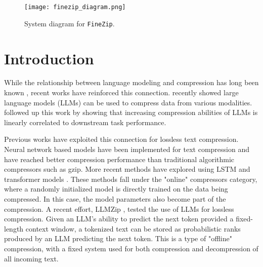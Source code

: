 \documentclass[11pt]{article}
\begin{document}

\begin{figure*}[ht]
    \centering
    \texttt{[image: finezip\_diagram.png]} %
    \centering
    \caption{System diagram for \texttt{FineZip}.}
    \centering
    \label{fig:system}
    \centering
\end{figure*}

\section{Introduction}
While the relationship between language modeling and compression has long been known \citep{sequential, mahoney2000fast, goyal2018deepzip, Bellard2019LosslessDC}, recent works \citep{delétang2024language, huang2024compression} have reinforced this connection. \citet{delétang2024language} recently showed large language models (LLMs) can be used to compress data from various modalities. \citet{huang2024compression} followed up this work by showing that increasing compression abilities of LLMs is linearly correlated to downstream task performance. 


Previous works have exploited this connection for lossless text compression. Neural network based models have been implemented for text compression \citep{sequential,mahoney2000fast, goyal2018deepzip} and have reached better compression performance than traditional algorithmic compressors such as gzip. More recent methods have explored using LSTM and transformer models \citep{Bellard2019LosslessDC,Bellard2021NNCPVL}. These methods fall under the "online" compressors category, where a randomly initialized model is directly trained on the data being compressed. In this case, the model parameters also become part of the compression. A recent effort, LLMZip \citep{valmeekam2023llmzip}, tested the use of LLMs for lossless compression. Given an LLM's ability to predict the next token provided a fixed-length context window, a tokenized text can be stored as probabilistic ranks produced by an LLM predicting the next token. This is a type of "offline" compression, with a fixed system used for both compression and decompression of all incoming text.
\end{document}
